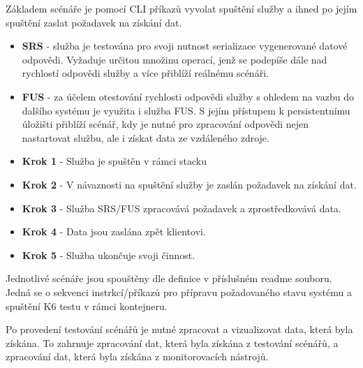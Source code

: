 Základem scénáře je pomocí CLI příkazů vyvolat spuštění služby a ihned po jejím spuštění zaslat požadavek na získání dat.



\begin{itemize}
    \item \textbf{SRS} - služba je testována pro svoji nutnost serializace vygenerované datové odpovědi. Vyžaduje určitou množinu operací, jenž se podepíše dále nad rychlostí odpovědi služby a více přiblíží reálnému scénáři.
    \item \textbf{FUS} - za účelem otestování rychlosti odpovědi služby s ohledem na vazbu do dalšího systému je využita i služba FUS. S jejím přístupem k persistentnímu úložišti přiblíží scénář, kdy je nutné pro zpracování odpovědi nejen nastartovat službu, ale i získat data ze vzdáleného zdroje.
\end{itemize}


\begin{itemize}
    \item \textbf{Krok 1} - Služba je spuštěn v rámci stacku
    \item \textbf{Krok 2} - V návaznosti na spuštění služby je zaslán požadavek na získání dat.
    \item \textbf{Krok 3} - Služba SRS/FUS zpracovává požadavek a zprostředkovává data.
    \item \textbf{Krok 4} - Data jsou zaslána zpět klientovi.
    \item \textbf{Krok 5} - Služba ukončuje svoji činnost.
\end{itemize}


Jednotlivé scénáře jsou spouštěny dle definice v příslušném readme souboru. Jedná se o sekvenci instrkcí/příkazů pro přípravu požadovaného stavu systému a spuštění K6 testu v rámci kontejneru.


Po provedení testování scénářů je nutné zpracovat a vizualizovat data, která byla získána. To zahrnuje zpracování dat, která byla získána z testování scénářů, a zpracování dat, která byla získána z monitorovacích nástrojů.


